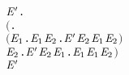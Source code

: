 \begin{alltt}
\HOLTokenTurnstile{}   \HOLSymConst{\HOLTokenImp{}}
   \HOLSymConst{\HOLTokenForall{}} \ensuremath{\HOLBoundVar{E}\sp{\prime}}.
       \ensuremath{(}\HOLSymConst{\HOLTokenForall{}}.
            \ensuremath{(}\HOLSymConst{\HOLTokenForall{}}\ensuremath{\HOLBoundVar{E}\sb{\mathrm{1}}}.  \HOLTokenTransBegin{}\HOLTokenTransEnd \ensuremath{\HOLBoundVar{E}\sb{\mathrm{1}}} \HOLSymConst{\HOLTokenImp{}} \HOLSymConst{\HOLTokenExists{}}\ensuremath{\HOLBoundVar{E}\sb{\mathrm{2}}}. \ensuremath{\HOLBoundVar{E}\sp{\prime}} \HOLTokenWeakTransBegin{}\HOLTokenWeakTransEnd \ensuremath{\HOLBoundVar{E}\sb{\mathrm{2}}} \HOLSymConst{\HOLTokenConj{}}  \ensuremath{\HOLBoundVar{E}\sb{\mathrm{1}}} \ensuremath{\HOLBoundVar{E}\sb{\mathrm{2}}}\ensuremath{)} \HOLSymConst{\HOLTokenConj{}}
            \HOLSymConst{\HOLTokenForall{}}\ensuremath{\HOLBoundVar{E}\sb{\mathrm{2}}}. \ensuremath{\HOLBoundVar{E}\sp{\prime}} \HOLTokenTransBegin{}\HOLTokenTransEnd \ensuremath{\HOLBoundVar{E}\sb{\mathrm{2}}} \HOLSymConst{\HOLTokenImp{}} \HOLSymConst{\HOLTokenExists{}}\ensuremath{\HOLBoundVar{E}\sb{\mathrm{1}}}.  \HOLTokenWeakTransBegin{}\HOLTokenWeakTransEnd \ensuremath{\HOLBoundVar{E}\sb{\mathrm{1}}} \HOLSymConst{\HOLTokenConj{}}  \ensuremath{\HOLBoundVar{E}\sb{\mathrm{1}}} \ensuremath{\HOLBoundVar{E}\sb{\mathrm{2}}}\ensuremath{)} \HOLSymConst{\HOLTokenImp{}}
        \HOLSymConst{\HOLTokenObsCongr} \ensuremath{\HOLBoundVar{E}\sp{\prime}}
\end{alltt}

